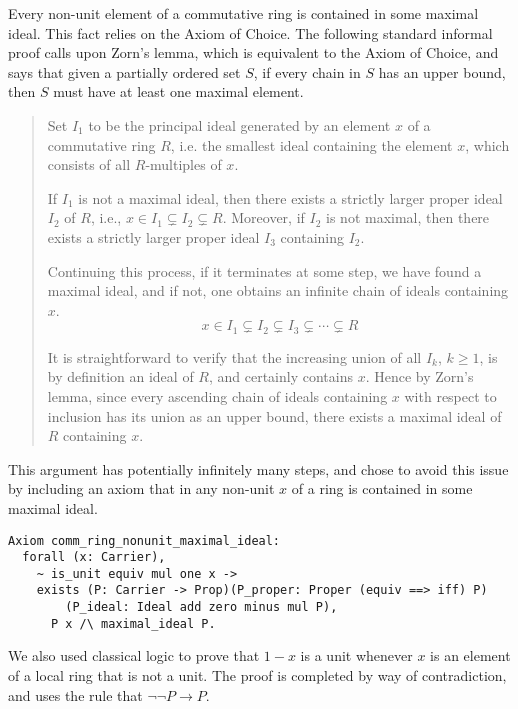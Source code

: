 \documentclass{article}
\begin{document}
Every non-unit element of a commutative ring is contained in some maximal
ideal. This fact relies on the Axiom of Choice. The following standard informal
proof calls upon Zorn's lemma, which is equivalent to the Axiom of Choice, and
says that given a partially ordered set $S$, if every chain in $S$ has an upper
bound, then $S$ must have at least one maximal element. 

\begin{quote}
    Set \(I_{1}\) to be the principal ideal generated by an element \(x\) of a
    commutative ring $R$, i.e. the smallest ideal containing the element $x$,
    which consists of all $R$-multiples of $x$.
   
    If \(I_{1}\) is not a maximal ideal, then there exists a strictly larger
    proper ideal \(I_{2}\) of $R$, i.e.,
    $x\in I_{1}\subsetneq I_{2} \subsetneq R$. Moreover, if  \(I_{2}\) is not
    maximal, then there exists a strictly larger proper ideal
    $I_{3}$ containing $I_2$.
    
    Continuing this process, if it terminates at some step, we have found a
    maximal ideal, and if not, one obtains an infinite chain of ideals
    containing \(x\).
    \[x\in I_{1}\subsetneq I_{2}\subsetneq I_{3}\subsetneq\cdots\subsetneq R\]
    
    It is straightforward to verify that the increasing union of all $I_{k}$, $k \geq 1$, 
    is by definition an ideal of $R$, and certainly
    contains \(x\).  Hence by Zorn's lemma, since every ascending chain of ideals
    containing $x$ with respect to inclusion has its union as an upper bound,
    there exists a maximal ideal of \(R\) containing \(x\).
\end{quote}

This argument has potentially infinitely many steps, and chose to avoid this
issue by including an axiom that in any non-unit \(x\) of a ring is contained in some
maximal ideal.

\begin{verbatim}
Axiom comm_ring_nonunit_maximal_ideal:
  forall (x: Carrier),
    ~ is_unit equiv mul one x ->
    exists (P: Carrier -> Prop)(P_proper: Proper (equiv ==> iff) P)
    	(P_ideal: Ideal add zero minus mul P),
      P x /\ maximal_ideal P.
\end{verbatim} 

We also used classical logic to prove that \(1 - x\) is a unit whenever \(x\) is
an element of a local ring that is not a unit. The proof is completed by way of contradiction, and uses the rule that  
 \(\neg\neg P\rightarrow
P\). 
\end{document}

